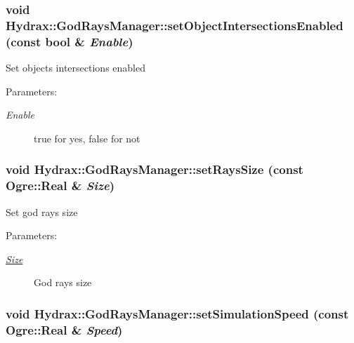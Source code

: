 \begin{CompactItemize}
{\subsubsection[{setObjectIntersectionsEnabled}]{\setlength{\rightskip}{0pt plus 5cm}void Hydrax::GodRaysManager::setObjectIntersectionsEnabled (const bool \& {\em Enable})}}
\label{class_hydrax_1_1_god_rays_manager_4a85152f7e71a50c473ae65b299f3465}


Set objects intersections enabled \begin{Desc}
\item[Parameters:]
\begin{description}
\item[{\em Enable}]true for yes, false for not \end{description}
\end{Desc}
\hypertarget{class_hydrax_1_1_god_rays_manager_92f0cf78d74335694d7e81b23e654ee7}{
\subsubsection[{setRaysSize}]{\setlength{\rightskip}{0pt plus 5cm}void Hydrax::GodRaysManager::setRaysSize (const Ogre::Real \& {\em Size})}}
\label{class_hydrax_1_1_god_rays_manager_92f0cf78d74335694d7e81b23e654ee7}


Set god rays size \begin{Desc}
\item[Parameters:]
\begin{description}
\item[{\em \hyperlink{struct_hydrax_1_1_size}{Size}}]God rays size \end{description}
\end{Desc}
\hypertarget{class_hydrax_1_1_god_rays_manager_b8080a305138ef10e0f18f9037f99a8d}{
\subsubsection[{setSimulationSpeed}]{\setlength{\rightskip}{0pt plus 5cm}void Hydrax::GodRaysManager::setSimulationSpeed (const Ogre::Real \& {\em Speed})}}
\label{class_hydrax_1_1_god_rays_manager_b8080a305138ef10e0f18f9037f99a8d}



\end{CompactItemize}
